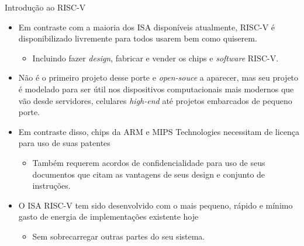 \documentclass[aspectratio=169]{beamer}
\begin{document}
\begin{frame}{Introdução ao RISC-V}
	\begin{itemize}
		\item Em contraste com a maioria dos ISA disponíveis atualmente, RISC-V é disponibilizado livremente para todos usarem bem como quiserem.
		\begin{itemize}
			\item Incluindo fazer \textit{design}, fabricar e vender os chips e \textit{software} RISC-V.
		\end{itemize}

		\item Não é o primeiro projeto desse porte e \textit{open-souce} a aparecer, mas seu projeto é modelado para ser útil nos dispositivos computacionais mais modernos que vão desde servidores, celulares \textit{high-end} até projetos embarcados de pequeno porte.

		\item Em contraste disso, chips da ARM e MIPS Technologies necessitam de licença para uso de suas patentes
		\begin{itemize}
			\item Também requerem acordos de confidencialidade para uso de seus documentos que citam as vantagens de seus design e conjunto de instruções.
		\end{itemize}

		\item O ISA RISC-V tem sido desenvolvido com o mais pequeno, rápido e mínimo gasto de energia de implementações existente hoje
		\begin{itemize}
			\item Sem sobrecarregar outras partes do seu sistema.
		\end{itemize}

	\end{itemize}
\end{frame}
\end{document}
